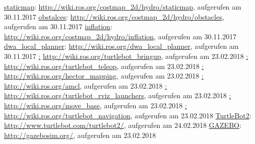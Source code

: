 \begin{thebibliography}{999}
 \href{http://wiki.ros.org/costmap_2d/hydro/staticmap}{staticmap}: \url{http://wiki.ros.org/costmap_2d/hydro/staticmap}, aufgerufen am 30.11.2017
 \href{http://wiki.ros.org/costmap_2d/hydro/obstacles}{obstalces}: \url{http://wiki.ros.org/costmap_2d/hydro/obstacles}, aufgerufen am 30.11.2017
 \href{http://wiki.ros.org/costmap_2d/hydro/inflation}{inflation}: \url{http://wiki.ros.org/costmap_2d/hydro/inflation}, aufgerufen am 30.11.2017
 \href{http://wiki.ros.org/dwa_local_planner}{dwa\_local\_planner}: \url{http://wiki.ros.org/dwa_local_planner}, aufgerufen am 30.11.2017
 \href{http://wiki.ros.org/turtlebot_bringup}: \url{http://wiki.ros.org/turtlebot_bringup}, aufgerufen am 23.02.2018
 \href{http://wiki.ros.org/turtlebot_teleop}: \url{http://wiki.ros.org/turtlebot_teleop}, aufgerufen am 23.02.2018
 \href{http://wiki.ros.org/hector_mapping}: \url{http://wiki.ros.org/hector_mapping}, aufgerufen am 23.02.2018
 \href{http://wiki.ros.org/amcl}: \url{http://wiki.ros.org/amcl}, aufgerufen am 23.02.2018
 \href{http://wiki.ros.org/turtlebot_rviz_launchers}: \url{http://wiki.ros.org/turtlebot_rviz_launchers}, aufgerufen am 23.02.2018
 \href{http://wiki.ros.org/move_base}: \url{http://wiki.ros.org/move_base}, aufgerufen am 23.02.2018
 \href{http://wiki.ros.org/turtlebot_navigation}: \url{http://wiki.ros.org/turtlebot_navigation}, aufgerufen am 23.02.2018
 \href{http://www.turtlebot.com/turtlebot2/}{TurtleBot2}: \url{http://www.turtlebot.com/turtlebot2/}, aufgerufen am 24.02.2018
 \href{http://gazebosim.org/}{GAZEBO}: \url{http://gazebosim.org/}, aufgerufen am 23.02.2018





\end{thebibliography}